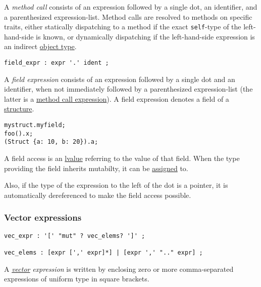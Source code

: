 \documentclass[]{article}
\begin{document}
A \emph{method call} consists of an expression followed by a single dot,
an identifier, and a parenthesized expression-list. Method calls are
resolved to methods on specific traits, either statically dispatching to
a method if the exact \texttt{self}-type of the left-hand-side is known,
or dynamically dispatching if the left-hand-side expression is an
indirect \hyperref[object-types]{object type}.


\begin{verbatim}
field_expr : expr '.' ident ;
\end{verbatim}

A \emph{field expression} consists of an expression followed by a single
dot and an identifier, when not immediately followed by a parenthesized
expression-list (the latter is a
\hyperref[method-call-expressions]{method call expression}). A field
expression denotes a field of a \hyperref[structure-types]{structure}.

\begin{verbatim}
mystruct.myfield;
foo().x;
(Struct {a: 10, b: 20}).a;
\end{verbatim}

A field access is an \hyperref[lvalues-rvalues-and-temporaries]{lvalue}
referring to the value of that field. When the type providing the field
inherits mutabilty, it can be
\hyperref[assignment-expressions]{assigned} to.

Also, if the type of the expression to the left of the dot is a pointer,
it is automatically dereferenced to make the field access possible.

\subsubsection{Vector expressions}\label{vector-expressions}

\begin{verbatim}
vec_expr : '[' "mut" ? vec_elems? ']' ;

vec_elems : [expr [',' expr]*] | [expr ',' ".." expr] ;
\end{verbatim}

A \hyperref[vector-types]{\emph{vector}} \emph{expression} is written by
enclosing zero or more comma-separated expressions of uniform type in
square brackets.
\end{document}
